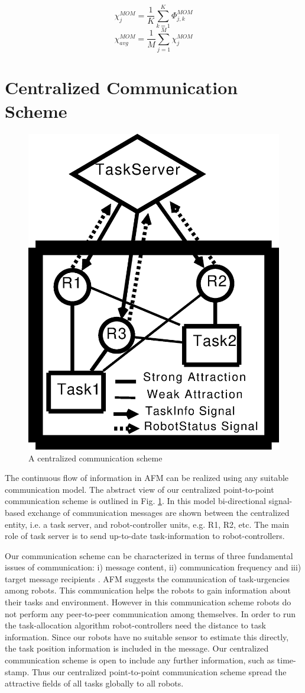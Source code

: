 \documentclass[smallcondensed]{svjour3}
\begin{document}
\begin{multicols}{2}
\small
\begin{equation}
\chi_{j}^{MOM}= \frac{1}{K} \sum_{k=1}^{K} \Phi_{j, k}^{MOM}
\label{eqn:sigle-pmw}
\end{equation}
\vspace*{0.2cm}
\begin{equation}
\chi_{avg}^{MOM}= \frac{1}{M} \sum_{j=1}^{M} {\chi_{j}^{MOM}}
\label{eqn:avg-pmw}
\end{equation}
\end{multicols}
\section{Centralized Communication Scheme}
\label{sec:comm}
\begin{figure}
\centering
\includegraphics[height=0.5\textwidth, angle=0]{./CentralizedComm.eps}
\caption{\small A centralized communication scheme} %
\label{fig:ccm} %
\end{figure}
The continuous flow of information in AFM can be realized using any suitable communication model. The abstract view of our centralized point-to-point communication scheme is outlined in Fig. \ref{fig:ccm}. In this model bi-directional signal-based exchange of communication messages are shown between the centralized entity, i.e. a task server, and robot-controller units, e.g. R1, R2, etc. The main role of task server is to send up-to-date task-information to robot-controllers. 

Our communication scheme can be characterized in terms of three fundamental issues of communication: i) message content, ii) communication frequency and iii) target message recipients \citep{Gerkey+2001}. AFM suggests the communication of task-urgencies among robots. This communication helps the robots to gain information about their tasks and environment. However in this communication scheme robots do not perform any peer-to-peer communication among themselves.  In order to run the task-allocation algorithm robot-controllers need the distance to task information. Since our robots have no suitable sensor to estimate this directly, the task position information is included in the message. Our centralized communication scheme is open to include any further information, such as time-stamp. Thus our centralized point-to-point communication scheme spread the attractive fields of all tasks globally to all robots.
\end{document}
